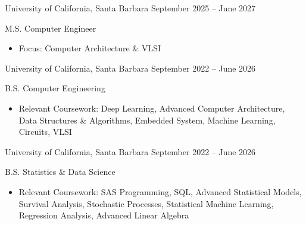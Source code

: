 \documentclass[9pt]{developercv} %
\begin{document}
\vspace{-4 pt}
\begin{entrylist}

\vspace{-4pt}

    \entry
    {}
    {University of California, Santa Barbara}
    {September 2025 – June 2027}
    {M.S. Computer Engineer
    \begin{itemize}[noitemsep,topsep=0pt,parsep=0pt,partopsep=0pt, leftmargin=10pt]
        \item Focus: Computer Architecture \& VLSI
    \end{itemize}}
    \entry
    {}
    {University of California, Santa Barbara}
    {September 2022 – June 2026}
    {B.S. Computer Engineering
    \begin{itemize}[noitemsep,topsep=0pt,parsep=0pt,partopsep=0pt, leftmargin=10pt]
        \item Relevant Coursework: Deep Learning, Advanced Computer Architecture, Data Structures \& Algorithms, Embedded System, Machine Learning, Circuits, VLSI
    \end{itemize}}

    \entry
    {}
    {University of California, Santa Barbara}
    {September 2022 – June 2026}
    {B.S. Statistics \& Data Science 
    \begin{itemize}[noitemsep,topsep=0pt,parsep=0pt,partopsep=0pt, leftmargin=10pt]
        \item Relevant Coursework: SAS Programming, SQL, Advanced Statistical Models, Survival Analysis, Stochastic Processes, Statistical Machine Learning, Regression Analysis, Advanced Linear Algebra
    \end{itemize}}
    
\end{entrylist}
\end{document}
